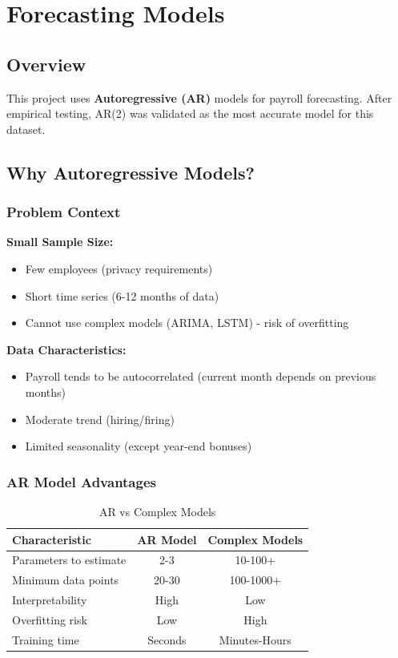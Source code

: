 \chapter{Forecasting Models}

\section{Overview}

This project uses \textbf{Autoregressive (AR)} models for payroll forecasting. After empirical testing, AR(2) was validated as the most accurate model for this dataset.

\section{Why Autoregressive Models?}

\subsection{Problem Context}

\textbf{Small Sample Size:}
\begin{itemize}
    \item Few employees (privacy requirements)
    \item Short time series (6-12 months of data)
    \item Cannot use complex models (ARIMA, LSTM) - risk of overfitting
\end{itemize}

\textbf{Data Characteristics:}
\begin{itemize}
    \item Payroll tends to be autocorrelated (current month depends on previous months)
    \item Moderate trend (hiring/firing)
    \item Limited seasonality (except year-end bonuses)
\end{itemize}

\subsection{AR Model Advantages}

\begin{table}[H]
\centering
\begin{tabular}{lcc}
\toprule
\textbf{Characteristic} & \textbf{AR Model} & \textbf{Complex Models} \\
\midrule
Parameters to estimate & 2-3 & 10-100+ \\
Minimum data points & 20-30 & 100-1000+ \\
Interpretability & High & Low \\
Overfitting risk & Low & High \\
Training time & Seconds & Minutes-Hours \\
\bottomrule
\end{tabular}
\caption{AR vs Complex Models}
\end{table}

